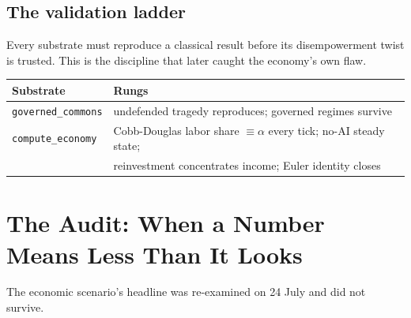 \documentclass[11pt]{article}
\begin{document}
\subsection{The validation ladder}

Every substrate must reproduce a classical result before its disempowerment twist is
trusted. This is the discipline that later caught the economy's own flaw.

\begin{center}
\begin{tabular}{@{}ll@{}}
\toprule
\textbf{Substrate} & \textbf{Rungs} \\
\midrule
\texttt{governed\_commons} & undefended tragedy reproduces; governed regimes survive \\
\texttt{compute\_economy}  & Cobb-Douglas labor share $\equiv \alpha$ every tick;
                             no-AI steady state; \\
                           & reinvestment concentrates income; Euler identity closes \\
\bottomrule
\end{tabular}
\end{center}

\section{The Audit: When a Number Means Less Than It Looks}
\label{sec:audit}

The economic scenario's headline was re-examined on 24 July and did not survive.

\begin{center}
\end{center}
\end{document}
